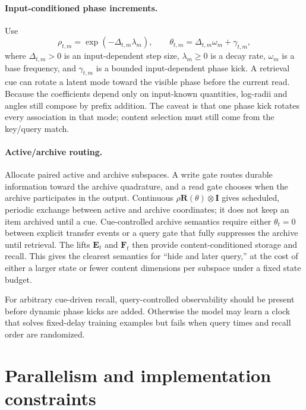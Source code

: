 \documentclass[11pt]{article}
\newcommand{\ve}[1]{\boldsymbol{#1}}
\newcommand{\I}{\ve{I}}
\begin{document}
\paragraph{Input-conditioned phase increments.}
Use
\begin{equation}
  \rho_{t,m}=\exp(-\Delta_{t,m}\lambda_m),
  \qquad
  \theta_{t,m}=\Delta_{t,m}\omega_m+\gamma_{t,m},
  \label{eq:dynamic-pole-parameterization}
\end{equation}
where $\Delta_{t,m}>0$ is an input-dependent step size, $\lambda_m\geq0$ is a decay rate,
$\omega_m$ is a base frequency, and $\gamma_{t,m}$ is a bounded input-dependent phase kick.
A retrieval cue can rotate a latent mode toward the visible phase before the current read.
Because the coefficients depend only on input-known quantities, log-radii and angles still
compose by prefix addition. The caveat is that one phase kick rotates every association in
that mode; content selection must still come from the key/query match.

\paragraph{Active/archive routing.}
Allocate paired active and archive subspaces. A write gate routes durable information toward
the archive quadrature, and a read gate chooses when the archive participates in the output.
Continuous $\rho\ve{R}(\theta)\otimes\I$ gives scheduled, periodic exchange between active
and archive coordinates; it does not keep an item archived until a cue. Cue-controlled archive
semantics require either $\theta_t=0$ between explicit transfer events or a query gate that
fully suppresses the archive until retrieval. The lifts $\ve{E}_t$ and $\ve{F}_t$ then provide
content-conditioned storage and recall. This gives the clearest semantics for ``hide and
later query,'' at the cost of either a larger state or fewer content dimensions per subspace
under a fixed state budget.

For arbitrary cue-driven recall, query-controlled observability should be present before
dynamic phase kicks are added. Otherwise the model may learn a clock that solves fixed-delay
training examples but fails when query times and recall order are randomized.


\section{Parallelism and implementation constraints}
\end{document}
